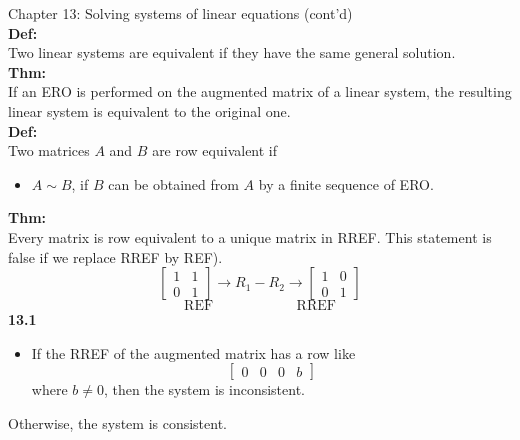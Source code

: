 \documentclass[]{article}
\begin{document}
		\pagebreak
		\Large{Chapter 13: Solving systems of linear equations (cont'd)}\\
		\normalsize
		{\bf Def:}\\
		Two linear systems are equivalent if they have the same general solution.\\
		{\bf Thm:}\\
		If an ERO is performed on the augmented matrix of a linear system, the resulting linear system is equivalent to the original one.\\
		{\bf Def:}\\
		Two matrices $A$ and $B$ are row equivalent if
		\begin{itemize}
			\item $A\sim B$, if $B$ can be obtained from $A$ by a finite sequence of ERO.
		\end{itemize}
		{\bf Thm:}\\
		Every matrix is row equivalent to a unique matrix in RREF. This statement is false if we replace RREF by REF).\\
		$$
			\begin{bmatrix}
				{1}&{1}\\
				{0}&{1}
			\end{bmatrix}
			\longrightarrow R_1-R_2\longrightarrow
			\begin{bmatrix}
				{1}&{0}\\
				{0}&{1}
			\end{bmatrix}
		$$
		$$
			\text{REF}~~~~~~~~~~~~~~~~~~~~~~~~~~~\text{RREF}
		$$
		{\bf 13.1}
		\begin{itemize}
			\item If the RREF of the augmented matrix has a row like
			$$
				\left[\begin{array}{ccc|c}
					{0}&{0}&{0}&{b}
				\end{array}\right]
			$$
			where $b\ne 0$, then the system is inconsistent.
		\end{itemize}
		Otherwise, the system is consistent.
\end{document}
